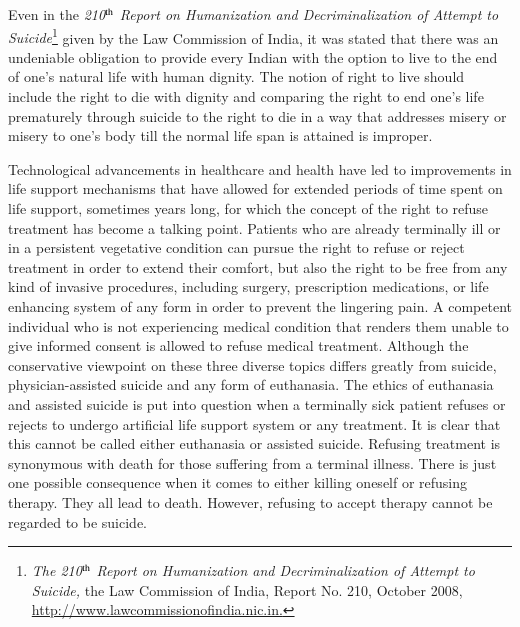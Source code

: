 \begin{multicols}{2}
\vspace{-.1cm}

\noi
Even in the \textit{210$^{\rm th}$ Report on Humanization and Decriminalization of Attempt to Suicide}\footnote{\textit{The 210$^{\rm th}$ Report on Humanization and Decriminalization of Attempt to Suicide,} the Law Commission of India, Report No. 210, October 2008, \url{http://www.lawcommissionofindia.nic.in.}}
 given by the Law Commission of India, it was stated that there was an undeniable obligation
to provide every Indian with the option to live to the end of one's natural life with human
dignity. The notion of right to live should include the right to die with dignity and comparing the right to end one's life prematurely through suicide to the right to die in a way that
addresses misery or misery to one's body till the normal life span is attained is improper.

\vspace{-.1cm}


\vspace{-.1cm}

\noi
Technological advancements in healthcare and health have led to improvements in life
support mechanisms that have allowed for extended periods of time spent on life support,
sometimes years long, for which the concept of the right to refuse treatment has become a
talking point. Patients who are already terminally ill or in a persistent vegetative condition
can pursue the right to refuse or reject treatment in order to extend their comfort, but also the
right to be free from any kind of invasive procedures, including surgery, prescription
medications, or life enhancing system of any form in order to prevent the lingering pain. A
competent individual who is not experiencing medical condition that renders them unable to
give informed consent is allowed to refuse medical treatment. Although the conservative
viewpoint on these three diverse topics differs greatly from suicide, physician-assisted suicide
and any form of euthanasia. The ethics of euthanasia and assisted suicide is put into question
when a terminally sick patient refuses or rejects to undergo artificial life support system or
any treatment. It is clear that this cannot be called either euthanasia or assisted suicide.
Refusing treatment is synonymous with death for those suffering from a terminal illness.
There is just one possible consequence when it comes to either killing oneself or refusing
therapy. They all lead to death. However, refusing to accept therapy cannot be regarded to be
suicide.


\end{multicols}
